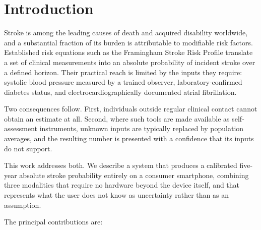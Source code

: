\documentclass[conference]{IEEEtran}
\begin{document}
\section{Introduction}

Stroke is among the leading causes of death and acquired disability worldwide, and
a substantial fraction of its burden is attributable to modifiable risk factors.
Established risk equations such as the Framingham Stroke Risk Profile translate a
set of clinical measurements into an absolute probability of incident stroke over
a defined horizon. Their practical reach is limited by the inputs they require:
systolic blood pressure measured by a trained observer, laboratory-confirmed
diabetes status, and electrocardiographically documented atrial fibrillation.

Two consequences follow. First, individuals outside regular clinical contact
cannot obtain an estimate at all. Second, where such tools are made available as
self-assessment instruments, unknown inputs are typically replaced by population
averages, and the resulting number is presented with a confidence that its inputs
do not support.

This work addresses both. We describe a system that produces a calibrated
five-year absolute stroke probability entirely on a consumer smartphone, combining
three modalities that require no hardware beyond the device itself, and that
represents what the user does not know as uncertainty rather than as an
assumption.

The principal contributions are:
\end{document}
